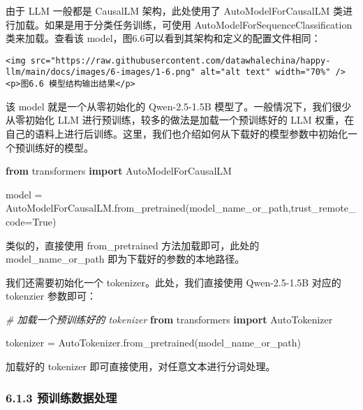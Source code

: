 \documentclass[
]{article}
\newenvironment{Shaded}{}{}
\newcommand{\CommentTok}[1]{\textcolor[rgb]{0.38,0.63,0.69}{\textit{#1}}}
\newcommand{\ImportTok}[1]{\textcolor[rgb]{0.00,0.50,0.00}{\textbf{#1}}}
\newcommand{\NormalTok}[1]{#1}
\newcommand{\OperatorTok}[1]{\textcolor[rgb]{0.40,0.40,0.40}{#1}}
\newcommand{\VariableTok}[1]{\textcolor[rgb]{0.10,0.09,0.49}{#1}}
\begin{document}
由于 LLM 一般都是 CausalLM 架构，此处使用了 AutoModelForCausalLM
类进行加载。如果是用于分类任务训练，可使用
AutoModelForSequenceClassification 类来加载。查看该
model，图6.6可以看到其架构和定义的配置文件相同：

\begin{verbatim}
<img src="https://raw.githubusercontent.com/datawhalechina/happy-llm/main/docs/images/6-images/1-6.png" alt="alt text" width="70%" />
<p>图6.6 模型结构输出结果</p>
\end{verbatim}

该 model 就是一个从零初始化的 Qwen-2.5-1.5B
模型了。一般情况下，我们很少从零初始化 LLM
进行预训练，较多的做法是加载一个预训练好的 LLM
权重，在自己的语料上进行后训练。这里，我们也介绍如何从下载好的模型参数中初始化一个预训练好的模型。

\begin{Shaded}
\begin{Highlighting}[]
\ImportTok{from}\NormalTok{ transformers }\ImportTok{import}\NormalTok{ AutoModelForCausalLM}

\NormalTok{model }\OperatorTok{=}\NormalTok{ AutoModelForCausalLM.from\_pretrained(model\_name\_or\_path,trust\_remote\_code}\OperatorTok{=}\VariableTok{True}\NormalTok{)}
\end{Highlighting}
\end{Shaded}

类似的，直接使用 from\_pretrained 方法加载即可，此处的
model\_name\_or\_path 即为下载好的参数的本地路径。

我们还需要初始化一个 tokenizer。此处，我们直接使用 Qwen-2.5-1.5B 对应的
tokenzier 参数即可：

\begin{Shaded}
\begin{Highlighting}[]
\CommentTok{\# 加载一个预训练好的 tokenizer}
\ImportTok{from}\NormalTok{ transformers }\ImportTok{import}\NormalTok{ AutoTokenizer}

\NormalTok{tokenizer }\OperatorTok{=}\NormalTok{ AutoTokenizer.from\_pretrained(model\_name\_or\_path)}
\end{Highlighting}
\end{Shaded}

加载好的 tokenizer 即可直接使用，对任意文本进行分词处理。

\subsubsection{6.1.3
预训练数据处理}\label{ux9884ux8badux7ec3ux6570ux636eux5904ux7406}
\end{document}

